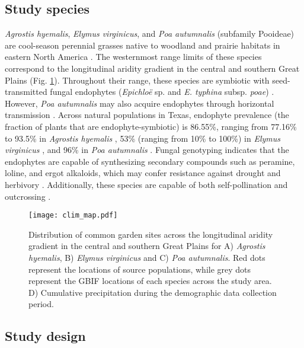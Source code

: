 \documentclass[12pt]{article}\usepackage[]{graphicx}\usepackage[dvipsnames]{xcolor}
\begin{document}
\subsection*{Study species}
\emph{Agrostis hyemalis}, \emph{Elymus virginicus}, and \emph{Poa autumnalis} (subfamily Pooideae) are cool-season perennial grasses native to woodland and prairie habitats in eastern North America \citep{shaw2011guide}. 
The westernmost range limits of these species correspond to the longitudinal aridity gradient in the central and southern Great Plains (Fig. \ref{fig:site}). 
Throughout their range, these species are symbiotic with seed-transmitted fungal endophytes (\emph{Epichloë} sp. and \emph{E. typhina} subsp. \emph{poae}) \citep{rudgers2009benefits}.
However, \emph{Poa autumnalis} may also acquire endophytes through horizontal transmission \citep{gundel2020simulated}. 
Across natural populations in Texas, endophyte prevalence (the fraction of plants that are endophyte-symbiotic) is 86.55\%, ranging from 77.16\% to 93.5\% in \emph{Agrostis hyemalis} \citep{donald2021context}, 53\% (ranging from 10\% to 100\%) in \emph{Elymus virginicus} \citep{sneck2017variation}, and 96\% in \emph{Poa autumnalis} \citep{rudgers2009fungus}. 
Fungal genotyping indicates that the endophytes are capable of synthesizing secondary compounds such as peramine, loline, and ergot alkaloids, which may confer resistance against drought and herbivory \citep{beaudry1951seed}. 
Additionally, these species are capable of both self-pollination and outcrossing \citep{church1958artificial}. 


\begin{figure}[h!]
\texttt{[image: clim\_map.pdf]}
\caption{Distribution of common garden sites across the longitudinal aridity gradient in the central and southern Great Plains for  A) \emph{Agrostis hyemalis}, B) \emph{Elymus virginicus} and C) \emph{Poa autumnalis}.
Red dots represent the locations of source populations, while grey dots represent the GBIF locations of each species across the study area.
D) Cumulative precipitation during the demographic data collection period.}
\label{fig:site}
\end{figure}

\subsection*{Study design}
\end{document}
